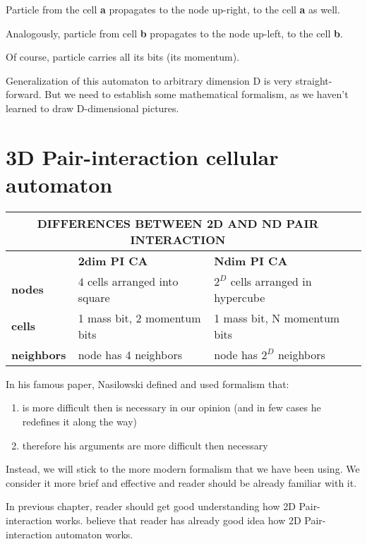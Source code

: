 Particle from the cell \textbf{a} propagates to the node up-right, to the cell \textbf{a} as well.

Analogously, particle from cell \textbf{b} propagates to the node up-left, to the cell \textbf{b}.

Of course, particle carries all its bits (its momentum).



Generalization of this automaton to arbitrary dimension D is very straight-forward. But we need to establish some mathematical formalism, as we haven't learned to draw D-dimensional pictures.

\section{3D Pair-interaction cellular automaton}

\begin{center}
    \begin{tabular}{| l | l | l | l |}
    \hline
    \multicolumn{3}{|c|}{DIFFERENCES BETWEEN \textbf{2}D AND \textbf{N}D PAIR INTERACTION}\\ \hline
     & \textbf{2dim PI CA} & \textbf{Ndim PI CA} \\ \hline
    \textbf{nodes} & $4$ cells arranged into square & $2^D$ cells arranged in hypercube \\ \hline
    \textbf{cells} & 1 mass bit, 2 momentum bits  & 1 mass bit, N momentum bits \\ \hline
    \textbf{neighbors} & node has 4 neighbors & node has $2^D$ neighbors  \\ \hline
    \end{tabular}
\end{center}

In his famous paper, Nasilowski defined and used formalism that:
\begin{enumerate}
\item is more difficult then is necessary in our opinion (and in few cases he redefines it along the way)
\item therefore his arguments are more difficult then necessary
\end{enumerate}


Instead, we will stick to the more modern formalism that we have been using.
We consider it more brief and effective and reader should be already familiar with it.

In previous chapter, reader should get good understanding how 2D Pair-interaction works.
believe that reader has already good idea how 2D Pair-interaction automaton works.

